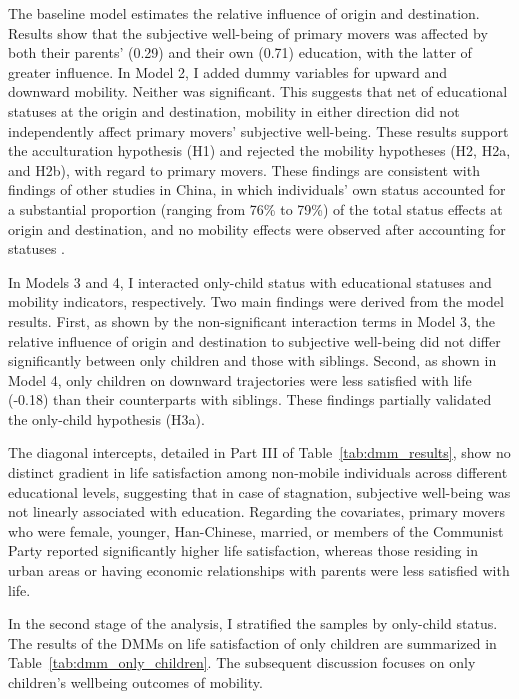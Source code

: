 The baseline model estimates the relative influence of origin and destination. Results show that the subjective well-being of primary movers was affected by both their parents' (0.29) and their own (0.71) education, with the latter of greater influence. In Model 2, I added dummy variables for upward and downward mobility. Neither was significant. This suggests that net of educational statuses at the origin and destination, mobility in either direction did not independently affect primary movers' subjective well-being. These results support the acculturation hypothesis (H1) and rejected the mobility hypotheses (H2, H2a, and H2b), with regard to primary movers. These findings are consistent with findings of other studies in China, in which individuals' own status accounted for a substantial proportion (ranging from 76\% to 79\%) of the total status effects at origin and destination, and no mobility effects were observed after accounting for statuses \parencite{zangFrustratedAchieversSatisfied2016,zhaoDifferentialAcculturationStudy2019,zhaoInterIntragenerationalSocial2017}.

In Models 3 and 4, I interacted only-child status with educational statuses and mobility indicators, respectively. Two main findings were derived from the model results. First, as shown by the non-significant interaction terms in Model 3, the relative influence of origin and destination to subjective well-being did not differ significantly between only children and those with siblings. Second, as shown in Model 4, only children on downward trajectories were less satisfied with life (-0.18) than their counterparts with siblings. These findings partially validated the only-child hypothesis (H3a).

The diagonal intercepts, detailed in Part III of Table~\ref{tab:dmm_results}, show no distinct gradient in life satisfaction among non-mobile individuals across different educational levels, suggesting that in case of stagnation, subjective well-being was not linearly associated with education. Regarding the covariates, primary movers who were female, younger, Han-Chinese, married, or members of the Communist Party reported significantly higher life satisfaction, whereas those residing in urban areas or having economic relationships with parents were less satisfied with life.

In the second stage of the analysis, I stratified the samples by only-child status. The results of the DMMs on life satisfaction of only children are summarized in Table~\ref{tab:dmm_only_children}. The subsequent discussion focuses on only children's wellbeing outcomes of mobility.

